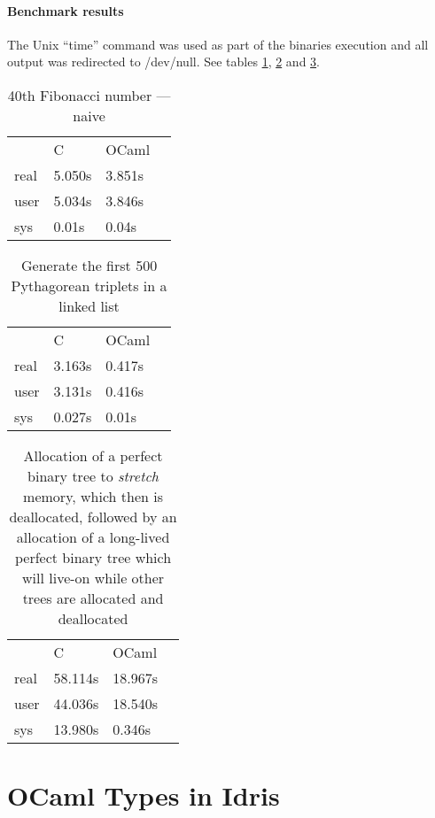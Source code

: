 \documentclass[a4paper,11pt,twocolumn]{article}
\begin{document}
\paragraph{Benchmark results}
The Unix ``time'' command was used as part of the binaries execution
and all output was redirected to /dev/null.
See tables \ref{tab:fibtab},
\ref{tab:pythagtab} and
\ref{tab:bintreetab}.

\begin{table}
    \centering
    \caption{40th Fibonacci number --- naive}
    \begin{tabular}{llll}\label{tab:fibtab}
             & C      & OCaml  & \\
        real & 5.050s & 3.851s & \\
        user & 5.034s & 3.846s & \\
        sys  & 0.01s  & 0.04s  &
    \end{tabular}
\end{table}

\begin{table}
    \centering
    \caption{Generate the first 500 Pythagorean triplets in a linked list}
    \begin{tabular}{llll}\label{tab:pythagtab}
             & C      & OCaml  & \\
        real & 3.163s & 0.417s & \\
        user & 3.131s & 0.416s & \\
        sys  & 0.027s & 0.01s  &
    \end{tabular}
\end{table}


\begin{table}
    \centering
    \caption{Allocation of a perfect binary tree to \emph{stretch} memory, which then is deallocated, followed by an allocation of a long-lived perfect binary tree which will live-on while other trees are allocated and deallocated}
    \begin{tabular}{llll}\label{tab:bintreetab}
             & C       & OCaml   & \\
        real & 58.114s & 18.967s & \\
        user & 44.036s & 18.540s & \\
        sys  & 13.980s & 0.346s  &
    \end{tabular}
\end{table}





\section{OCaml Types in Idris}
\end{document}
